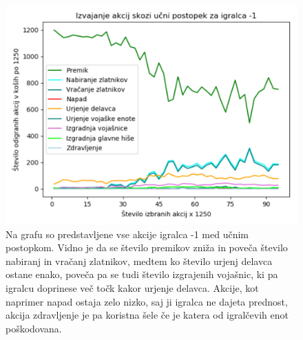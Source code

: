 \documentclass[a4paper, 12pt]{book}
\begin{document}
\begin{figure}[h]
	\begin{center}
		\includegraphics[width=1\textwidth]{photos/all_acts_playerminus1.pdf}
	\end{center}
	\caption{Na grafu so predstavljene vse akcije igralca -1 med učnim postopkom.
		Vidno je da se število premikov zniža in poveča število nabiranj in vračanj zlatnikov, medtem ko število urjenj delavca ostane enako, poveča pa se tudi število izgrajenih vojašnic, ki pa igralcu doprinese več točk kakor urjenje delavca.
	Akcije, kot naprimer napad ostaja zelo nizko, saj ji igralca ne dajeta prednost, akcija zdravljenje je pa koristna šele če je katera od igralčevih enot poškodovana. }
	\label{all_acts_playerminus1}
\end{figure}
\end{document}
